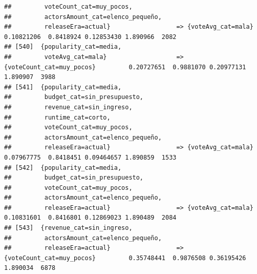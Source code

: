 \documentclass[
]{article}
\begin{document}
\begin{verbatim}
##         voteCount_cat=muy_pocos,                                                                                                
##         actorsAmount_cat=elenco_pequeño,                                                                                        
##         releaseEra=actual}                  => {voteAvg_cat=mala}                0.10821206  0.8418924 0.12853430 1.890966  2082
## [540]  {popularity_cat=media,                                                                                                   
##         voteAvg_cat=mala}                   => {voteCount_cat=muy_pocos}         0.20727651  0.9881070 0.20977131 1.890907  3988
## [541]  {popularity_cat=media,                                                                                                   
##         budget_cat=sin_presupuesto,                                                                                             
##         revenue_cat=sin_ingreso,                                                                                                
##         runtime_cat=corto,                                                                                                      
##         voteCount_cat=muy_pocos,                                                                                                
##         actorsAmount_cat=elenco_pequeño,                                                                                        
##         releaseEra=actual}                  => {voteAvg_cat=mala}                0.07967775  0.8418451 0.09464657 1.890859  1533
## [542]  {popularity_cat=media,                                                                                                   
##         budget_cat=sin_presupuesto,                                                                                             
##         voteCount_cat=muy_pocos,                                                                                                
##         actorsAmount_cat=elenco_pequeño,                                                                                        
##         releaseEra=actual}                  => {voteAvg_cat=mala}                0.10831601  0.8416801 0.12869023 1.890489  2084
## [543]  {revenue_cat=sin_ingreso,                                                                                                
##         actorsAmount_cat=elenco_pequeño,                                                                                        
##         releaseEra=actual}                  => {voteCount_cat=muy_pocos}         0.35748441  0.9876508 0.36195426 1.890034  6878

\end{verbatim}
\end{document}
